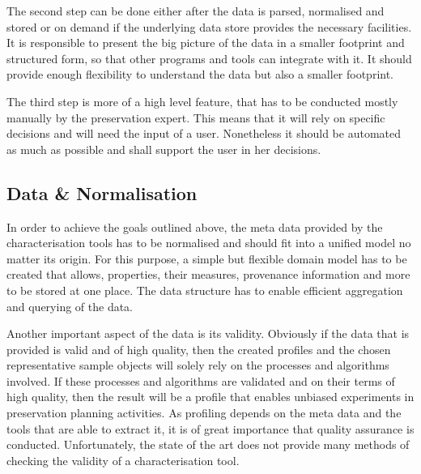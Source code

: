 The second step can be done either after the data is parsed, normalised and stored or on demand if the underlying data store provides the necessary facilities. It is responsible to present the big picture of the data in a smaller footprint and structured form, so that other programs and tools can integrate with it. It should provide enough flexibility to understand the data but also a smaller footprint.

The third step is more of a high level feature, that has to be conducted mostly manually by the preservation expert. This means that it will rely on specific decisions and will need the input of a user. Nonetheless it should be automated as much as possible and shall support the user in her decisions.


\subsection{Data \& Normalisation}
In order to achieve the goals outlined above, the meta data provided by the characterisation tools has to be normalised and should fit into a unified model no matter its origin. For this purpose, a simple but flexible domain model has to be created that allows, properties, their measures, provenance information and more to be stored at one place.
The data structure has to enable efficient aggregation and querying of the data. 

Another important aspect of the data is its validity. Obviously if the data that is provided is valid and of high quality, then the created profiles and the chosen representative sample objects will solely rely on the processes and algorithms involved. If these processes and algorithms are validated and on their terms of high quality, then the result will be a profile that enables unbiased experiments in preservation planning activities. As profiling depends on the meta data and the tools that are able to extract it, it is of great importance that quality assurance is conducted. Unfortunately, the state of the art does not provide many methods of checking the validity of a characterisation tool. %

